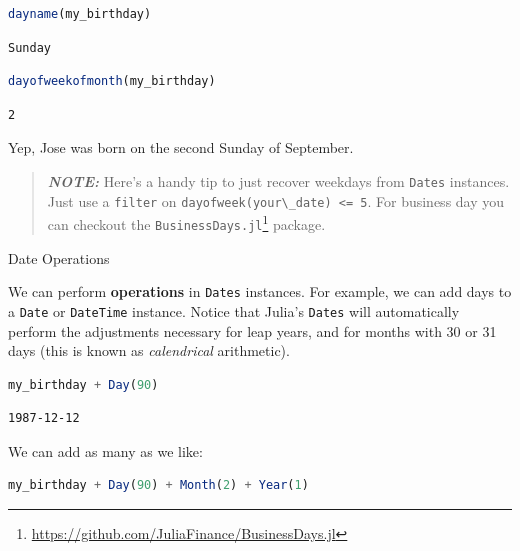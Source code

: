 \documentclass[
  notoc %
]{tufte-book}
\makeatletter
\DeclareRobustCommand{\href}[2]{#2\footnote{\url{#1}}}
\newcommand{\passthrough}[1]{#1}
\renewcommand\subsubsection{%
\@startsection{subsubsection}{3}{\z@ }{-3.25ex\@plus -1ex \@minus -.2ex}{1.5ex \@plus .2ex}{\normalfont \normalsize \bfseries }
}
\makeatother
\begin{document}
\begin{lstlisting}[language=Julia]
dayname(my_birthday)
\end{lstlisting}

\begin{lstlisting}[language=Output]
Sunday
\end{lstlisting}

\begin{lstlisting}[language=Julia]
dayofweekofmonth(my_birthday)
\end{lstlisting}

\begin{lstlisting}[language=Output]
2
\end{lstlisting}

Yep, Jose was born on the second Sunday of September.

\begin{quote}
\textbf{\emph{NOTE:}} Here's a handy tip to just recover weekdays from
\passthrough{\lstinline!Dates!} instances. Just use a
\passthrough{\lstinline!filter!} on
\passthrough{\lstinline!dayofweek(your\_date) <= 5!}. For business day
you can checkout the
\href{https://github.com/JuliaFinance/BusinessDays.jl}{\passthrough{\lstinline!BusinessDays.jl!}}
package.
\end{quote}

\hypertarget{sec:dates_operations}{%
\subsubsection{Date Operations}\label{sec:dates_operations}}

We can perform \textbf{operations} in \passthrough{\lstinline!Dates!}
instances. For example, we can add days to a
\passthrough{\lstinline!Date!} or \passthrough{\lstinline!DateTime!}
instance. Notice that Julia's \passthrough{\lstinline!Dates!} will
automatically perform the adjustments necessary for leap years, and for
months with 30 or 31 days (this is known as \emph{calendrical}
arithmetic).

\begin{lstlisting}[language=Julia]
my_birthday + Day(90)
\end{lstlisting}

\begin{lstlisting}[language=Output]
1987-12-12
\end{lstlisting}

We can add as many as we like:

\begin{lstlisting}[language=Julia]
my_birthday + Day(90) + Month(2) + Year(1)
\end{lstlisting}
\end{document}

